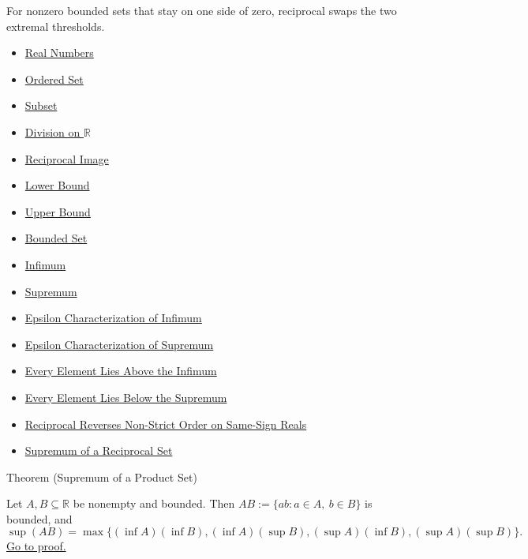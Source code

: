 \begin{remark*}[Interpretation]
For nonzero bounded sets that stay on one side of zero, reciprocal swaps the
two extremal thresholds.
\end{remark*}

\begin{dependencies}
\begin{itemize}
  \item \hyperref[def:reals]{Real Numbers}
  \item \hyperref[def:ordered-set]{Ordered Set}
  \item \hyperref[def:subset]{Subset}
  \item \hyperref[def:division-on-r]{Division on $\mathbb{R}$}
  \item \hyperref[def:reciprocal-image]{Reciprocal Image}
  \item \hyperref[def:real-lower-bound]{Lower Bound}
  \item \hyperref[def:real-upper-bound]{Upper Bound}
  \item \hyperref[def:bounded]{Bounded Set}
  \item \hyperref[def:infimum]{Infimum}
  \item \hyperref[def:supremum]{Supremum}
  \item \hyperref[def:epsilon-characterization-of-infimum]{Epsilon Characterization of Infimum}
  \item \hyperref[def:epsilon-characterization-of-supremum]{Epsilon Characterization of Supremum}
  \item \hyperref[prop:every-element-lies-above-the-infimum]{Every Element Lies Above the Infimum}
  \item \hyperref[prop:every-element-lies-below-the-supremum]{Every Element Lies Below the Supremum}
  \item \hyperref[thm:reciprocal-reverses-nonstrict-order-on-same-sign-r]{Reciprocal Reverses Non-Strict Order on Same-Sign Reals}
  \item \hyperref[thm:supremum-reciprocal-set]{Supremum of a Reciprocal Set}
\end{itemize}
\end{dependencies}

\begin{theorembox}{Theorem (Supremum of a Product Set)}
\begin{theorem}
\label{thm:supremum-product-set}
Let $A,B\subseteq\mathbb{R}$ be nonempty and bounded.  Then
$AB:=\{ab:a\in A,\ b\in B\}$ is bounded, and
\[
  \sup(AB)=
  \max\{(\inf A)(\inf B),(\inf A)(\sup B),(\sup A)(\inf B),(\sup A)(\sup B)\}.
\]
\hyperref[prf:supremum-product-set]{Go to proof.}
\end{theorem}
\end{theorembox}

